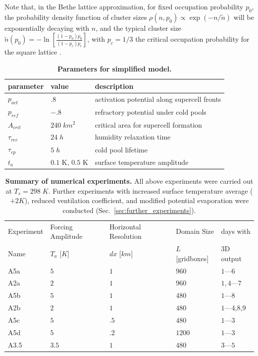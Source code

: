 \documentclass[draft,linenumbers]{agujournal2019}
\begin{document}
Note that, in the Bethe lattice approximation, for fixed occupation probability $p_0$, the probability density function of cluster sizes $\rho(n,p_0)\propto \exp(-n/\tilde{n})$ will be exponentially decaying with $n$, and the typical cluster size $\tilde{n}(p_0)=-\ln \left[ \frac{(1-p_0)p_0}{(1-p_c)p_c}\right]$, with $p_c=1/3$ the critical occupation probability for the square lattice \cite{christensen2005complexity}.
\begin{table}[b]
\begin{tabular}{lll}
parameter & value & description \\
\hline
$p_{act}$ & $.8$ & activation potential along supercell fronts \\ 
$p_{ref}$ & $-.8$ & refractory potential under cold pools\\
$A_{crit}$ & $240\;km^2$ & critical area for supercell formation \\
$\tau_{rec}$ & $24\;h$ & humidity relaxation time \\ 
$\tau_{cp}$ & $5\;h$ & cold pool lifetime \\ 
$t_a$ & $0.1$ K, $0.5$ K & surface temperature amplitude 
\hline
\end{tabular}
\caption{{\bf Parameters for simplified model.}
}
\label{tab:parameters}
\end{table}


\begin{table}[]
\begin{tabular}{lllll}
Experiment & Forcing Amplitude & Horizontal Resolution & Domain Size & days with\\
Name & $T_a$ [$K$] & $dx$ [$km$] & $L$ [gridboxes] & 3D output\\
\hline
A5a & $5$ & $1$ & $960$ & $1$---$6$ \\
A2a & $2$ & $1$ & $960$ & $1,4$---$7$ \\
A5b & $5$ & $1$ & $480$ &  $1$---$8$\\
A2b & $2$ & $1$ & $480$ &  $1$---$4$,$8$,$9$\\
A5c & $5$ & $.5$ & $480$ & $1$---$3$ \\
A5d & $5$ & $.2$ & $1200$ & $1$---$3$ \\
A3.5 & $3.5$ & $1$ & $480$ & $3$---$5$\\
 \hline
\end{tabular}
\caption{{\bf Summary of numerical experiments.}
All above experiments were carried out at $T_s=298\;K$. Further experiments with increased surface temperature average ($+2K$), reduced ventilation coefficient, and modified potential evaporation were conducted (Sec.~\ref{sec:further_experiments}). }
\label{tab:experiments}
\end{table}
\end{document}
